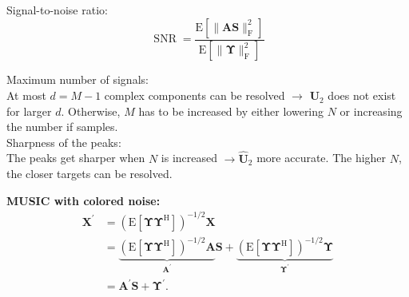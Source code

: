 \documentclass[english]{latex4ei/latex4ei_sheet}
\begin{document}
\begin{sectionbox}
  Signal-to-noise ratio:
  $$\operatorname{SNR} = \frac{\mathrm{E}\left[\|\boldsymbol{A} \boldsymbol{S}\|_{\mathrm{F}}^{2}\right]}{\mathrm{E}\left[\|\boldsymbol{\Upsilon}\|_{\mathrm{F}}^{2}\right]}$$
  
  Maximum number of signals:\\
  At most $d = M-1$ complex components can be resolved $\rightarrow$ $\boldsymbol{U}_2$ does not exist for larger $d$. Otherwise, $M$ has to be increased by either lowering $N$ or increasing the number if samples.\\

  Sharpness of the peaks:\\
  The peaks get sharper when $N$ is increased $\rightarrow \hat{\boldsymbol{U}}_2$ more accurate. The higher $N$, the closer targets can be resolved.

  \textbf{MUSIC with colored noise:}
$$\begin{aligned}
  \boldsymbol{X}^{\prime} &=\left(\mathrm{E}\left[\boldsymbol{\Upsilon} \boldsymbol{\Upsilon}^{\mathrm{H}}\right]\right)^{-1 / 2} \boldsymbol{X} \\
  &=\underbrace{\left(\mathrm{E}\left[\boldsymbol{\Upsilon} \boldsymbol{\Upsilon}^{\mathrm{H}}\right]\right)^{-1 / 2} \boldsymbol{A}}_{\boldsymbol{A}^{\prime}} \boldsymbol{S}+\underbrace{\left(\mathrm{E}\left[\boldsymbol{\Upsilon} \boldsymbol{\Upsilon}^{\mathrm{H}}\right]\right)^{-1 / 2} \boldsymbol{\Upsilon}}_{\boldsymbol{\Upsilon}^{\prime}} \\
  &=\boldsymbol{A}^{\prime} \boldsymbol{S}+\boldsymbol{\Upsilon}^{\prime} .
  \end{aligned}$$
\end{sectionbox}
\end{document}
